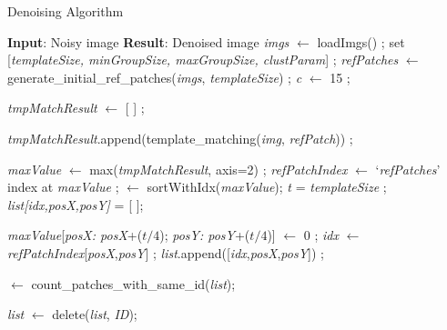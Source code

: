 \documentclass[fleqn,10pt]{wlscirep}
\begin{document}
\begin{algorithm}
	\caption{Denoising Algorithm}
	\label{algorithm:denoising_algorithm}
	\begin{algorithmic}[1]
		\State \textbf{Input}: Noisy image
		\State \textbf{Result}: Denoised image
		\State \textit{imgs} $\gets$ loadImgs() ;
		\State set [\textit{templateSize, minGroupSize, maxGroupSize, clustParam}] ;
		\State \textit{refPatches} $\gets$ generate\_initial\_ref\_patches(\textit{imgs}, \textit{templateSize}) ;
		\State \textit{c} $\gets$ 15 ;
		
		
		\State \textit{tmpMatchResult} $\gets$ [ ]	;		
		
		
		\State \textit{tmpMatchResult}.append(template\_matching(\textit{img}, \textit{refPatch})) ;
		
		\EndFor
		\EndFor
		
		\State \textit{maxValue} $\gets$ max(\textit{tmpMatchResult}, axis=2) ;
		\State \textit{refPatchIndex} $\gets$ `\textit{refPatches}' index at \textit{maxValue} ;
		 $\gets$ sortWithIdx(\textit{maxValue}); 
		\State \textit{t} = \textit{templateSize} ;
		\State \textit{list[\textit{idx},\textit{posX},\textit{posY}]} = [ ];
		
		\State \textit{maxValue}[\textit{posX: posX}+($t/4$); \textit{posY: posY}+($t/4$)] $\gets$ 0 ;
		\State \textit{idx} $\gets$ \textit{refPatchIndex}[\textit{posX},\textit{posY}] ;
		\State \textit{list}.append([\textit{idx},\textit{posX},\textit{posY}]) ;
		\EndIf
		\EndFor
		
		 $\gets$ count\_patches\_with\_same\_id(\textit{list});
		
		\State \textit{list} $\gets$ delete(\textit{list}, \textit{ID});
		

\end{algorithmic}
\end{algorithm}
\end{document}
